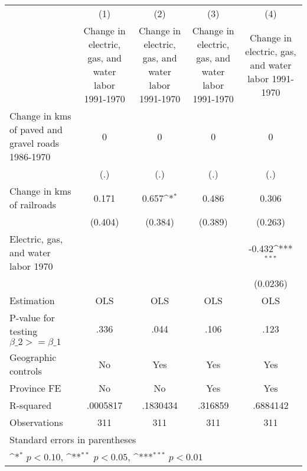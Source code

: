 {
\def\sym#1{\ifmmode^{#1}\else\(^{#1}\)\fi}
\begin{tabular}{l*{4}{c}}
\hline\hline
                    &\multicolumn{1}{c}{(1)}&\multicolumn{1}{c}{(2)}&\multicolumn{1}{c}{(3)}&\multicolumn{1}{c}{(4)}\\
                    &\multicolumn{1}{c}{Change in electric, gas, and water labor 1991-1970}&\multicolumn{1}{c}{Change in electric, gas, and water labor 1991-1970}&\multicolumn{1}{c}{Change in electric, gas, and water labor 1991-1970}&\multicolumn{1}{c}{Change in electric, gas, and water labor 1991-1970}\\
\hline
Change in kms of paved and gravel roads 1986-1970&           0         &           0         &           0         &           0         \\
                    &         (.)         &         (.)         &         (.)         &         (.)         \\
[1em]
Change in kms of railroads&       0.171         &       0.657\sym{*}  &       0.486         &       0.306         \\
                    &     (0.404)         &     (0.384)         &     (0.389)         &     (0.263)         \\
[1em]
Electric, gas, and water labor 1970&                     &                     &                     &      -0.432\sym{***}\\
                    &                     &                     &                     &    (0.0236)         \\
\hline
Estimation          &         OLS         &         OLS         &         OLS         &         OLS         \\
P-value for testing $\beta\_2 >= \beta\_1$&        .336         &        .044         &        .106         &        .123         \\
Geographic controls &          No         &         Yes         &         Yes         &         Yes         \\
Province FE         &          No         &          No         &         Yes         &         Yes         \\
R-squared           &    .0005817         &    .1830434         &     .316859         &    .6884142         \\
Observations        &         311         &         311         &         311         &         311         \\
\hline\hline
\multicolumn{5}{l}{\footnotesize Standard errors in parentheses}\\
\multicolumn{5}{l}{\footnotesize \sym{*} \(p<0.10\), \sym{**} \(p<0.05\), \sym{***} \(p<0.01\)}\\
\end{tabular}
}
